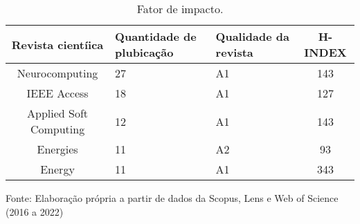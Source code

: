 \begin{table}[H]
	\centering
	\caption{Fator de impacto.}\label{tb2}
	\begin{tabular}{@{}cp{3cm}p{3cm}c@{}}
		\toprule
		Revista cientíica      & Quantidade de plubicação & Qualidade da revista & H-INDEX \\\midrule
		Neurocomputing         & 27                         & A1                     & 143     \\
		IEEE Access            & 18                         & A1                     & 127     \\
		Applied Soft Computing & 12                         & A1                     & 143     \\
		Energies               & 11                         & A2                     & 93      \\
		Energy                 & 11                         & A1                     & 343     \\ \bottomrule
	\end{tabular}
	
	
	\vspace{0.2cm}
	Fonte: Elaboração própria a partir de dados da Scopus, Lens e Web of Science (2016 a 2022)
\end{table}